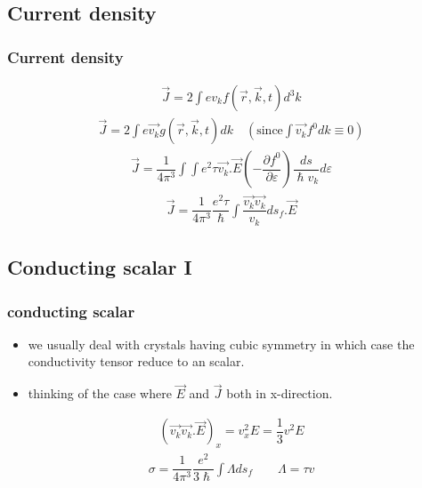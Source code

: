 \documentclass{beamer}
\begin{document}
\subsection{Current density}
\begin{frame}
\frametitle{Current density}
\pause
\begin{align*}
\vec{J} = 2 \int e v_k f (\vec{r},\vec{k},t) d^3k
\end{align*}
\pause
\begin{align*}
\vec{J} = 2 \int e \vec{v_k} g (\vec{r},\vec{k},t) dk \quad (\text{since} \int \vec{v_k} f^0 dk \equiv 0) 
\end{align*}
\pause
\begin{align*}
\vec{J} = \dfrac{1}{4 \pi ^3} \int \int e^2 \tau \vec{v_k}.\vec{E} (- \dfrac{\partial f^0}{\partial \varepsilon}) \dfrac{ds}{\hslash v_k}d\varepsilon 
\end{align*}
\pause
\begin{align*}
\vec{J} = \dfrac{1}{4 \pi ^3} \dfrac{e^2 \tau}{\hslash} \int \dfrac{\vec{v_k}\vec{v_k}}{v_k}ds_f .\vec{E}
\end{align*}
\end{frame}
\subsection{Conducting scalar I}
\begin{frame}
\frametitle{conducting scalar}
\begin{itemize}
\item we usually deal with crystals having cubic symmetry in which case the conductivity tensor reduce to  an scalar.
\pause
\item thinking of the case where $\vec{E}$ and $\vec{J}$ both in x-direction.
\end{itemize}
\pause
\begin{align*}
(\vec{v_k}\vec{v_k}.\vec{E})_x = v_x^2 E = \dfrac{1}{3} v^2 E
\end{align*}
\pause
\begin{align*}
\sigma = \dfrac{1}{4 \pi ^3} \dfrac{e^2}{3 \hslash} \int \Lambda ds_f  \qquad \Lambda = \tau v
\end{align*}
\end{frame}
\end{document}
